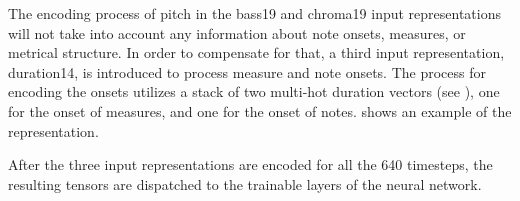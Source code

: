 
The encoding process of pitch in the \gls{bass19} and
\gls{chroma19} input representations will not take into
account any information about note onsets, measures, or
metrical structure. In order to compensate for that, a third
input representation, \gls{duration14}, is introduced to
process measure and note onsets. The process for encoding
the onsets utilizes a stack of two multi-hot duration
vectors (see ), one for the
onset of measures, and one for the onset of notes.
 shows an example of the
representation.


After the three input representations are encoded for all
the 640 timesteps, the resulting tensors are dispatched to
the trainable layers of the neural network.
